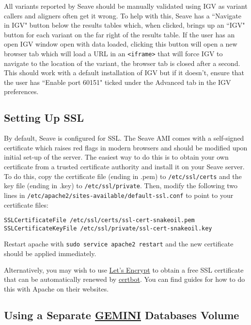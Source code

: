 \documentclass[11pt, a4paper]{article}
\newcommand{\GEMINI}{\href{https://gemini.readthedocs.io}{GEMINI} } %
\begin{document}
All variants reported by Seave should be manually validated using IGV as variant callers and aligners often get it wrong. To help with this, Seave has a ``Navigate in IGV" button below the results tables which, when clicked, brings up an ``IGV" button for each variant on the far right of the results table. If the user has an open IGV window open with data loaded, clicking this button will open a new browser tab which will load a URL in an \texttt{<iframe>} that will force IGV to navigate to the location of the variant, the browser tab is closed after a second. This should work with a default installation of IGV but if it doesn't, ensure that the user has ``Enable port 60151" ticked under the Advanced tab in the IGV preferences.


\subsection{Setting Up SSL}\label{settingUpSSL}

By default, Seave is configured for SSL. The Seave AMI comes with a self-signed certificate which raises red flags in modern browsers and should be modified upon initial set-up of the server. The easiest way to do this is to obtain your own certificate from a trusted certificate authority and install it on your Seave server. To do this, copy the certificate file (ending in .pem) to \texttt{/etc/ssl/certs} and the key file (ending in .key) to \texttt{/etc/ssl/private}. Then, modify the following two lines in \texttt{/etc/apache2/sites-available/default-ssl.conf} to point to your certificate files:

\begin{lstlisting}
SSLCertificateFile /etc/ssl/certs/ssl-cert-snakeoil.pem
SSLCertificateKeyFile /etc/ssl/private/ssl-cert-snakeoil.key
\end{lstlisting}

Restart apache with \texttt{sudo service apache2 restart} and the new certificate should be applied immediately.

Alternatively, you may wish to use \href{https://letsencrypt.org}{Let's Encrypt} to obtain a free SSL certificate that can be automatically renewed by \href{https://certbot.eff.org}{certbot}. You can find guides for how to do this with Apache on their websites.


\subsection{Using a Separate \GEMINI Databases Volume}
\end{document}
